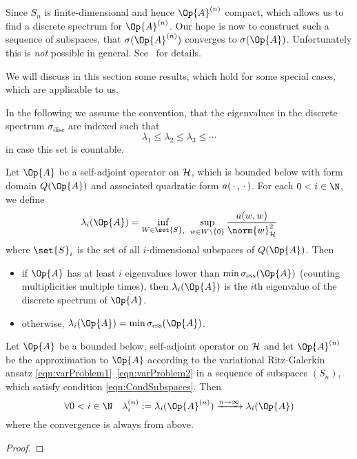 Since $S_n$ is finite-dimensional and hence $\Op{A}^{(n)}$ compact,
which allows us to find a discrete spectrum for $\Op{A}^{(n)}$.
Our hope is now to construct such a sequence of subspaces,
that $\sigma(\Op{A}^{(n)})$ converges to $\sigma(\Op{A})$.
Unfortunately this is \emph{not} possible in general.
See~\cite{Helffer2013} for details.

We will discuss in this section some results,
which hold for some special cases, which are applicable to us.





In the following we assume the convention,
that the eigenvalues in the discrete spectrum $\sigma_\text{disc}$
are indexed such that
\[ \lambda_1 \leq \lambda_2 \leq \lambda_3 \leq \cdots \]
in case this set is countable.

\begin{thm}
	\label{thm:CourantFischer}
	Let $\Op{A}$ be a self-adjoint operator on $\mathcal{H}$,
	which is bounded below with form domain $Q(\Op{A})$
	and associated quadratic form $a(\,\cdot\,,\,\cdot\,)$.
	For each $0 < i \in \N$, we define
	\begin{equation}
		\lambda_i(\Op{A}) = \inf_{W \in \set{S}_i} \ \sup_{w \in W \backslash \{0\}}
		\frac{a(w,w)}{\norm{w}_\hilbert^2}
		\label{eqn:CourantFischer}
	\end{equation}
	where $\set{S}_i$ is the set of all $i$-dimensional subspaces of $Q(\Op{A})$.
	Then
	\begin{itemize}
		\item if $\Op{A}$ has at least $i$ eigenvalues lower
			than $\min \sigma_\text{ess}(\Op{A})$ (counting multiplicities multiple times),
			then $\lambda_i(\Op{A})$ is the $i$th eigenvalue of the discrete spectrum
			of $\Op{A}$.
		\item otherwise, $\lambda_i(\Op{A}) = \min \sigma_\text{ess}(\Op{A})$.
	\end{itemize}
\end{thm}

\begin{thm}
	Let $\Op{A}$ be a bounded below, self-adjoint operator on $\mathcal{H}$
	and let $\Op{A}^{(n)}$ be the approximation to $\Op{A}$
	according to the variational Ritz-Galerkin ansatz
	\eqref{eqn:varProblem1}--\eqref{eqn:varProblem2}
	in a sequence of subspaces $(S_n)$,
	which satisfy condition \eqref{eqn:CondSubspaces}.
	Then
	\[ \forall 0 < i \in \N \quad \lambda^{(n)}_i := \lambda_i(\Op{A}^{(n)}) \xrightarrow{n\to\infty} \lambda_i(\Op{A}) \]
	where the convergence is always from above.
	\begin{proof}
	\end{proof}
\end{thm}

